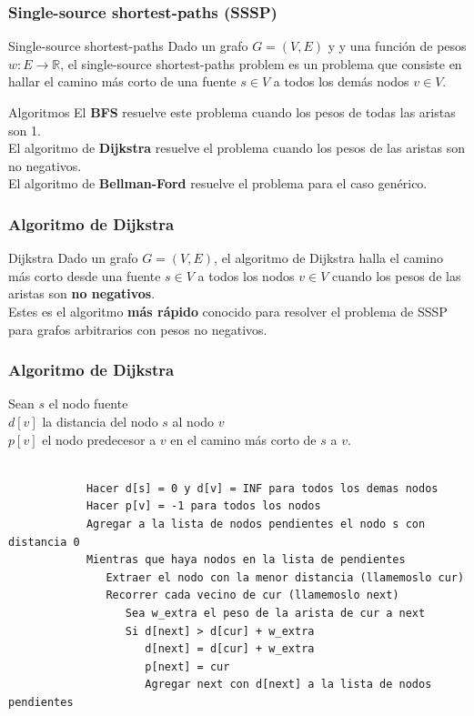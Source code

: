 \documentclass{beamer}
\begin{document}
	\begin{frame}
		\frametitle{Single-source shortest-paths (SSSP)}
		\begin{block}{Single-source shortest-paths}
			Dado un grafo $G = (V, E)$ y y una función de pesos $w : E \rightarrow \mathbb{R}$, el single-source shortest-paths problem es un problema que consiste en hallar el camino más corto de una fuente $s \in V$ a todos los demás nodos $v \in V$.\\
		\end{block}
		\begin{exampleblock}{Algoritmos}
			El \textbf{BFS} resuelve este problema cuando los pesos de todas las aristas son 1.\\
			El algoritmo de \textbf{Dijkstra} resuelve el problema cuando los pesos de las aristas son no negativos.\\
			El algoritmo de \textbf{Bellman-Ford} resuelve el problema para el caso genérico.
		\end{exampleblock}
	\end{frame}
	
	\begin{frame}
		\frametitle{Algoritmo de Dijkstra}
		\begin{block}{Dijkstra}
			Dado un grafo $G = (V, E)$, el algoritmo de Dijkstra halla el camino más corto desde una fuente $s \in V$ a todos los nodos $v \in V$ cuando los pesos de las aristas son \textbf{no negativos}.\\
			Estes es el algoritmo \textbf{más rápido} conocido para resolver el problema de SSSP para grafos arbitrarios con pesos no negativos.
		\end{block}
	\end{frame}
	
	\begin{frame}[fragile]
		\frametitle{Algoritmo de Dijkstra}
		Sean $s$ el nodo fuente\\
		\qquad $d[v]$ la distancia del nodo $s$ al nodo $v$\\
		\qquad $p[v]$ el nodo predecesor a $v$ en el camino más corto de $s$ a $v$.\\ \quad \\
		\begin{lstlisting}
			Hacer d[s] = 0 y d[v] = INF para todos los demas nodos
			Hacer p[v] = -1 para todos los nodos
			Agregar a la lista de nodos pendientes el nodo s con distancia 0
			Mientras que haya nodos en la lista de pendientes
			   Extraer el nodo con la menor distancia (llamemoslo cur)
			   Recorrer cada vecino de cur (llamemoslo next)
			      Sea w_extra el peso de la arista de cur a next
			      Si d[next] > d[cur] + w_extra
			         d[next] = d[cur] + w_extra
			         p[next] = cur
			         Agregar next con d[next] a la lista de nodos pendientes
		\end{lstlisting}
	\end{frame}
	
\end{document}
